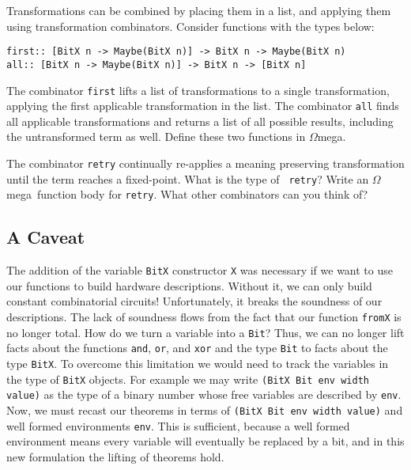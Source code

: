 \documentclass[11pt,twoside,A4]{llncs}
\newcommand{\om}{\emph{$\Omega$}mega}
\begin{document}
\begin{exercise}
Transformations can be combined by placing them in a list, and applying them
using transformation combinators. Consider functions with the types below:

{\small
\begin{verbatim}
first:: [BitX n -> Maybe(BitX n)] -> BitX n -> Maybe(BitX n) 
all:: [BitX n -> Maybe(BitX n)] -> BitX n -> [BitX n]
\end{verbatim}}
\vspace*{-.05in}

The combinator {\tt first} lifts
a list of transformations to a single transformation, applying the first
applicable transformation in the list.
The combinator {\tt all} finds all applicable transformations
and returns a list of all possible results, including the
untransformed term as well. Define these two functions in \om.

The combinator {\tt retry} continually re-applies a meaning preserving
transformation until the term reaches a fixed-point. What is the type of {\tt
retry}? Write an \om\ function body for {\tt retry}.
What other combinators can you think of?
\end{exercise}

\subsection{A Caveat} \label{caveat}

The addition of the variable \verb+BitX+ constructor \verb+X+ was necessary if we
want to use our functions to build hardware descriptions. Without it, we can only
build constant combinatorial circuits!  Unfortunately, it breaks the soundness of
our descriptions. The lack of soundness flows from the fact that our function
\verb+fromX+ is no longer total. How do we turn a variable into a {\tt Bit}? Thus,
we can no longer lift facts about the functions {\tt and}, {\tt or}, and {\tt xor} and
the type {\tt Bit} to facts about the type {\tt BitX}. To overcome this limitation
we would need to track the variables in the type of {\tt BitX} objects. For example
we may write
\verb+(BitX Bit env width value)+ as the type of a binary number whose 
free variables are described by {\tt env}. Now, we must recast our theorems in 
terms of \verb+(BitX Bit env width value)+ and well formed environments {\tt env}.
This is sufficient, because a well formed environment means every variable
will eventually be replaced by a bit, and in this new formulation the lifting
of theorems hold. 
\end{document}
